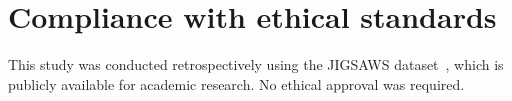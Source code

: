 \section{Compliance with ethical standards}
\label{sec:ethics}

This study was conducted retrospectively using the JIGSAWS
dataset~\cite{Gao2014}, which is publicly available for academic research. No
ethical approval was required.
